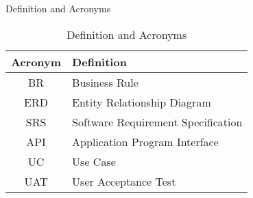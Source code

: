Definition and Acronyms

\begin{table}[htbp]
    \centering
    \begin{tabularx}{\textwidth}{|c|X|}
        \hline
        \textbf{Acronym} & \textbf{Definition} \\ \hline
        BR & Business Rule\\ \hline
        ERD & Entity Relationship Diagram\\ \hline
        SRS & Software Requirement Specification\\ \hline
        API & Application Program Interface\\ \hline
        UC & Use Case\\ \hline
        UAT & User Acceptance Test\\ \hline
    \end{tabularx}
    \caption{Definition and Acronyms}
    \label{tab:Definition-and-Acronyms}
\end{table}
